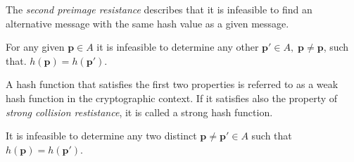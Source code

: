 The \textit{second preimage resistance} describes that it is infeasible to find an alternative message with the same hash value as a given message.

\begin{definition}
    For any given $\bm{p} \in A$ it is infeasible to determine any other $\bm{p}' \in A,\; \bm{p} \neq \bm{p}$, such that. $h(\bm{p})=h(\bm{p}')$.
\end{definition}

A hash function that satisfies the first two properties is referred to as a weak hash function in the cryptographic context. If it satisfies also the property of \textit{strong collision restistance}, it is called a strong hash function. 
\begin{definition}
   It is infeasible to determine any two distinct $\bm{p} \neq \bm{p}' \in A$ such that $h(\bm{p})=h(\bm{p}')$.
\end{definition}


